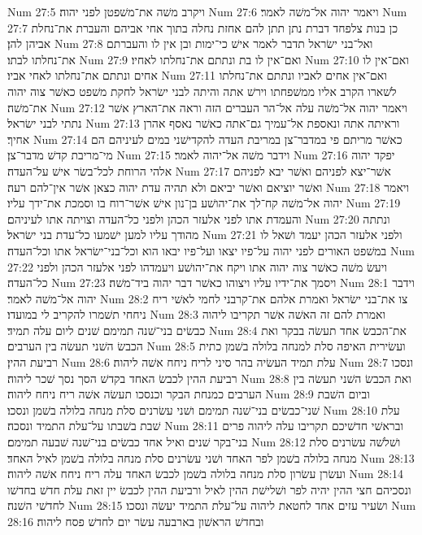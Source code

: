 Num 27:5  ויקרב משׁה את־משׁפטן לפני יהוה׃
Num 27:6  ויאמר יהוה אל־משׁה לאמר׃
Num 27:7  כן בנות צלפחד דברת נתן תתן להם אחזת נחלה בתוך אחי אביהם והעברת את־נחלת אביהן להן׃
Num 27:8  ואל־בני ישׂראל תדבר לאמר אישׁ כי־ימות ובן אין לו והעברתם את־נחלתו לבתו׃
Num 27:9  ואם־אין לו בת ונתתם את־נחלתו לאחיו׃
Num 27:10  ואם־אין לו אחים ונתתם את־נחלתו לאחי אביו׃
Num 27:11  ואם־אין אחים לאביו ונתתם את־נחלתו לשׁארו הקרב אליו ממשׁפחתו וירשׁ אתה והיתה לבני ישׂראל לחקת משׁפט כאשׁר צוה יהוה את־משׁה׃
Num 27:12  ויאמר יהוה אל־משׁה עלה אל־הר העברים הזה וראה את־הארץ אשׁר נתתי לבני ישׂראל׃
Num 27:13  וראיתה אתה ונאספת אל־עמיך גם־אתה כאשׁר נאסף אהרן אחיך׃
Num 27:14  כאשׁר מריתם פי במדבר־צן במריבת העדה להקדישׁני במים לעיניהם הם מי־מריבת קדשׁ מדבר־צן׃
Num 27:15  וידבר משׁה אל־יהוה לאמר׃
Num 27:16  יפקד יהוה אלהי הרוחת לכל־בשׂר אישׁ על־העדה׃
Num 27:17  אשׁר־יצא לפניהם ואשׁר יבא לפניהם ואשׁר יוציאם ואשׁר יביאם ולא תהיה עדת יהוה כצאן אשׁר אין־להם רעה׃
Num 27:18  ויאמר יהוה אל־משׁה קח־לך את־יהושׁע בן־נון אישׁ אשׁר־רוח בו וסמכת את־ידך עליו׃
Num 27:19  והעמדת אתו לפני אלעזר הכהן ולפני כל־העדה וצויתה אתו לעיניהם׃
Num 27:20  ונתתה מהודך עליו למען ישׁמעו כל־עדת בני ישׂראל׃
Num 27:21  ולפני אלעזר הכהן יעמד ושׁאל לו במשׁפט האורים לפני יהוה על־פיו יצאו ועל־פיו יבאו הוא וכל־בני־ישׂראל אתו וכל־העדה׃
Num 27:22  ויעשׂ משׁה כאשׁר צוה יהוה אתו ויקח את־יהושׁע ויעמדהו לפני אלעזר הכהן ולפני כל־העדה׃
Num 27:23  ויסמך את־ידיו עליו ויצוהו כאשׁר דבר יהוה ביד־משׁה׃
Num 28:1  וידבר יהוה אל־משׁה לאמר׃
Num 28:2  צו את־בני ישׂראל ואמרת אלהם את־קרבני לחמי לאשׁי ריח ניחחי תשׁמרו להקריב לי במועדו׃
Num 28:3  ואמרת להם זה האשׁה אשׁר תקריבו ליהוה כבשׂים בני־שׁנה תמימם שׁנים ליום עלה תמיד׃
Num 28:4  את־הכבשׂ אחד תעשׂה בבקר ואת הכבשׂ השׁני תעשׂה בין הערבים׃
Num 28:5  ועשׂירית האיפה סלת למנחה בלולה בשׁמן כתית רביעת ההין׃
Num 28:6  עלת תמיד העשׂיה בהר סיני לריח ניחח אשׁה ליהוה׃
Num 28:7  ונסכו רביעת ההין לכבשׂ האחד בקדשׁ הסך נסך שׁכר ליהוה׃
Num 28:8  ואת הכבשׂ השׁני תעשׂה בין הערבים כמנחת הבקר וכנסכו תעשׂה אשׁה ריח ניחח ליהוה׃
Num 28:9  וביום השׁבת שׁני־כבשׂים בני־שׁנה תמימם ושׁני עשׂרנים סלת מנחה בלולה בשׁמן ונסכו׃
Num 28:10  עלת שׁבת בשׁבתו על־עלת התמיד ונסכה׃
Num 28:11  ובראשׁי חדשׁיכם תקריבו עלה ליהוה פרים בני־בקר שׁנים ואיל אחד כבשׂים בני־שׁנה שׁבעה תמימם׃
Num 28:12  ושׁלשׁה עשׂרנים סלת מנחה בלולה בשׁמן לפר האחד ושׁני עשׂרנים סלת מנחה בלולה בשׁמן לאיל האחד׃
Num 28:13  ועשׂרן עשׂרון סלת מנחה בלולה בשׁמן לכבשׂ האחד עלה ריח ניחח אשׁה ליהוה׃
Num 28:14  ונסכיהם חצי ההין יהיה לפר ושׁלישׁת ההין לאיל ורביעת ההין לכבשׂ יין זאת עלת חדשׁ בחדשׁו לחדשׁי השׁנה׃
Num 28:15  ושׂעיר עזים אחד לחטאת ליהוה על־עלת התמיד יעשׂה ונסכו׃
Num 28:16  ובחדשׁ הראשׁון בארבעה עשׂר יום לחדשׁ פסח ליהוה׃
